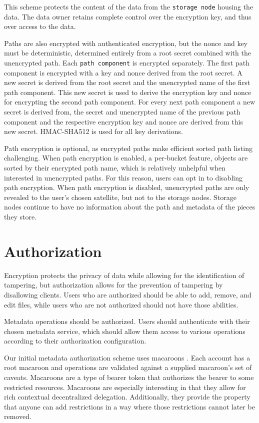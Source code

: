 \documentclass[11pt,fleqn,openany]{book}
\newcommand{\x}[1]{{\tt #1}} \newcommand{\code}[1]{{\em #1}}
\begin{document}
This scheme protects the
content of the data from the \x{storage node} housing the data. The data owner
retains complete control over the encryption key, and thus over access to the
data.

Paths are also encrypted with authenticated encryption, but the nonce and key
must be deterministic, determined entirely from a root secret combined with the
unencrypted path. Each \x{path component} is encrypted separately.
The first path component is encrypted with a key and nonce derived from the
root secret. A new secret is derived from the root secret and the unencrypted
name of the first path component. This new secret is used to derive the
encryption key and nonce for encrypting the second path component. For every
next path component a new secret is derived from, the secret and unencrypted
name of the previous path component and the respective encryption key and
nonce are derived from this new secret. HMAC-SHA512 is used for all key
derivations.

Path encryption is optional, as encrypted paths make efficient sorted path
listing challenging. When path encryption is enabled, a per-bucket feature,
objects are sorted by their encrypted path name, which is relatively unhelpful
when interested in unencrypted paths. For this reason, users can opt in to
disabling path encryption. When path encryption is disabled, unencrypted paths
are only revealed to the user's chosen satellite, but not to the storage
nodes. Storage nodes continue to have no information about the path and
metadata of the pieces they store.

\section{Authorization}\label{sec:concrete-authorization}

Encryption protects the privacy of data while allowing for the identification
of tampering, but authorization allows for the prevention of tampering by
disallowing clients. Users who are authorized should be able to add, remove,
and edit files, while users who are not authorized should not have those abilities.

Metadata operations should be authorized. Users should authenticate with
their chosen metadata service, which should allow them
access to various operations according to their authorization configuration.

Our initial metadata authorization scheme uses macaroons \cite{macaroons}.
Each account has a root macaroon and operations are validated against a supplied
macaroon's set of caveats. Macaroons are a type of bearer token that authorizes
the bearer to some restricted resources. Macaroons are especially interesting
in that they allow for rich contextual decentralized delegation. Additionally, they 
provide the property that anyone can add restrictions in a way where those
restrictions cannot later be removed.
\end{document}
